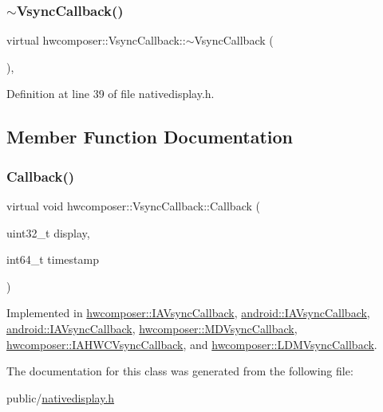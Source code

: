 \subsubsection{\texorpdfstring{$\sim$\+Vsync\+Callback()}{~VsyncCallback()}}
{\footnotesize\ttfamily virtual hwcomposer\+::\+Vsync\+Callback\+::$\sim$\+Vsync\+Callback (\begin{DoxyParamCaption}{ }\end{DoxyParamCaption})\hspace{0.3cm}{\ttfamily [inline]}, {\ttfamily [virtual]}}



Definition at line 39 of file nativedisplay.\+h.


\begin{DoxyCode}{0}
\end{DoxyCode}


\subsection{Member Function Documentation}
\mbox{\label{classhwcomposer_1_1VsyncCallback_a632ac6a2e13e1b387df9508507a2ed4d}} 
\subsubsection{\texorpdfstring{Callback()}{Callback()}}
{\footnotesize\ttfamily virtual void hwcomposer\+::\+Vsync\+Callback\+::\+Callback (\begin{DoxyParamCaption}\item[{uint32\+\_\+t}]{display,  }\item[{int64\+\_\+t}]{timestamp }\end{DoxyParamCaption})\hspace{0.3cm}{\ttfamily [pure virtual]}}



Implemented in \mbox{\hyperlink{classhwcomposer_1_1IAVsyncCallback_a9ccc6eb6a50d308473716a225e320c8d}{hwcomposer\+::\+I\+A\+Vsync\+Callback}}, \mbox{\hyperlink{classandroid_1_1IAVsyncCallback_ab5d04e5b2c2c36fc58639bbd9867cb54}{android\+::\+I\+A\+Vsync\+Callback}}, \mbox{\hyperlink{classandroid_1_1IAVsyncCallback_ab5d04e5b2c2c36fc58639bbd9867cb54}{android\+::\+I\+A\+Vsync\+Callback}}, \mbox{\hyperlink{classhwcomposer_1_1MDVsyncCallback_af9ca73f30e00626c613f23871359f4d8}{hwcomposer\+::\+M\+D\+Vsync\+Callback}}, \mbox{\hyperlink{classhwcomposer_1_1IAHWCVsyncCallback_a8e89987e4a1f85b917f82166978ede94}{hwcomposer\+::\+I\+A\+H\+W\+C\+Vsync\+Callback}}, and \mbox{\hyperlink{classhwcomposer_1_1LDMVsyncCallback_ae92d66fdf645fa105ac163e33e5e6526}{hwcomposer\+::\+L\+D\+M\+Vsync\+Callback}}.



The documentation for this class was generated from the following file\+:\begin{DoxyCompactItemize}
\item 
public/\mbox{\hyperlink{nativedisplay_8h}{nativedisplay.\+h}}\end{DoxyCompactItemize}
